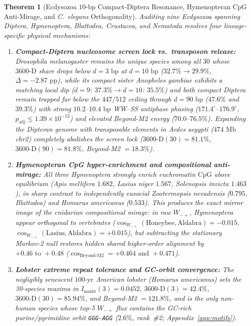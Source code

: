 \documentclass[11pt,a4paper]{article}
\renewcommand{\_}{\origunderscore\penalty200\relax}
\newtheorem{theorem}{Theorem}[section]
\theoremstyle{remark}
\begin{document}
\begin{theorem}[Ecdysozoa $10\text{-bp}$ Compact-Diptera Resonance, Hymenopteran CpG Anti-Mirage, and \textit{C.\ elegans} Orthogonality]
\label{thm:L8g}
Auditing nine Ecdysozoa spanning Diptera, Hymenoptera, Blattodea, Crustacea, and Nematoda resolves four lineage-specific physical mechanisms:
\begin{enumerate}
  \item \textbf{Compact-Diptera nucleosome screen lock vs.\ transposon release:} \textit{Drosophila melanogaster} remains the unique species among all $30$ whose $3600\text{-D}$ share drops below $d=3\text{ bp}$ at $d=10\text{ bp}$ ($32.7\% \to 29.9\%$, $\Delta = -2.87\text{ pp}$), while its compact sister \textit{Anopheles gambiae} exhibits a matching local dip ($d=9$: $37.3\% \to d=10$: $35.5\%$) and both compact Diptera remain trapped far below the $447/512$ ceiling through $d=90\text{ bp}$ ($47.6\%$ and $39.3\%$) with strong $10.2\text{--}10.4\text{ bp}$ WW--SS antiphase phasing ($171.4^\circ\text{--}176.9^\circ$, $p_{\mathrm{adj}} \le 1.39\times 10^{-12}$) and elevated Beyond-M2 energy ($70.0\text{--}76.5\%$). Expanding the Dipteran genome with transposable elements in \textit{Aedes aegypti} ($474\text{ Mb}$ chr2) completely abolishes the screen lock ($\mathrm{3600\text{-}D}(30)=81.1\%$, $\mathrm{3600\text{-}D}(90)=81.8\%$, Beyond-M2 $= 18.3\%$).
  \item \textbf{Hymenopteran CpG hyper-enrichment and compositional anti-mirage:} All three Hymenoptera strongly enrich euchromatin $\mathrm{CpG}$ above equilibrium (\textit{Apis mellifera} $1.682$, \textit{Lasius niger} $1.567$, \textit{Solenopsis invicta} $1.463$), in sharp contrast to independently eusocial \textit{Zootermopsis nevadensis} ($0.795$, Blattodea) and \textit{Homarus americanus} ($0.533$). This produces the exact mirror image of the cnidarian compositional mirage: in raw $W_{-+}$, Hymenoptera appear orthogonal to vertebrates ($\cos_{W_{-+}}(\text{Honeybee}, \text{Aldabra}) = -0.015$, $\cos_{W_{-+}}(\text{Lasius}, \text{Aldabra}) = +0.015$), but subtracting the stationary Markov-2 null \emph{restores} hidden shared higher-order alignment by $+0.46\text{ to }+0.48$ ($\cos_{\mathrm{Beyond\text{-}M2}} = +0.464\text{ and }+0.471$).
  \item \textbf{Lobster extreme repeat tolerance and GC-orbit convergence:} The negligibly senescent $100\text{-yr}$ American lobster (\textit{Homarus americanus}) sets the 30-species maxima in $I_{\mathrm{nonbr}}(3)=0.0452$, $\mathrm{3600\text{-}D}(3)=42.4\%$, $\mathrm{3600\text{-}D}(30)=85.94\%$, and Beyond-M2 $=121.8\%$, and is the only non-human species whose top-5 $W_{-+}$ flux contains the GC-rich purine/pyrimidine orbit \texttt{GGG-AGG} ($2.6\%$, rank~\#2; Appendix~\ref{app:motifs}).

\end{enumerate}
\end{theorem}
\end{document}

